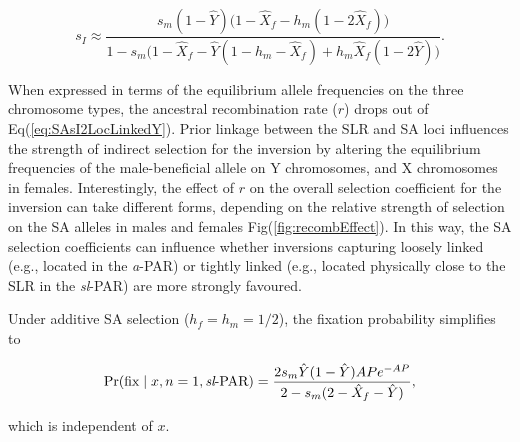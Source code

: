 \documentclass[11pt]{article}
\begin{document}
\begin{equation}\label{eq:SAsI2LocLinkedY}
	s_I \approx \frac{ s_m(1 - \hat{Y}) \big( 1 - \hat{X}_f - h_m(1 - 2\hat{X}_f) \big)} { 1 - s_m \big(1 - \hat{X}_f - \hat{Y}(1 - h_m - \hat{X}_f) + h_m \hat{X}_f(1 - 2 \hat{Y}) \big) }.
\end{equation}

\noindent When expressed in terms of the equilibrium allele frequencies on the three chromosome types, the ancestral recombination rate ($r$) drops out of Eq(\ref{eq:SAsI2LocLinkedY}). Prior linkage between the SLR and SA loci influences the strength of indirect selection for the inversion by altering the equilibrium frequencies of the male-beneficial allele on Y chromosomes, and X chromosomes in females. Interestingly, the effect of $r$ on the overall selection coefficient for the inversion can take different forms, depending on the relative strength of selection on the SA alleles in males and females Fig(\ref{fig:recombEffect}). In this way, the SA selection coefficients can influence whether inversions capturing loosely linked (e.g., located in the {\itshape a}-PAR) or tightly linked (e.g., located physically close to the SLR in the {\itshape sl}-PAR) are more strongly favoured.

Under additive SA selection ($h_f = h_m = 1/2$), the fixation probability simplifies to

\begin{equation}\label{eq:SAsIpFix2LocLinked}
	\Pr(\text{fix} \mid x,n=1,\text{{\itshape sl}-PAR}) = \frac{ 2 s_m \hat{Y} (1 - \hat{Y}) A P e^{-A P}}{ 2 - s_m (2 - \hat{X}_f - \hat{Y}) },
\end{equation}

\noindent which is independent of $x$. \vspace{12pt}

\vspace{12pt}
\end{document}
